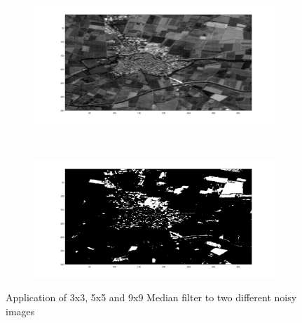\documentclass{article}
\begin{document}
	\begin{figure}[h!]
		\centering
		\begin{subfigure}[t]{0.5\textwidth}
			\centering
			\includegraphics[height=\linewidth, width=\linewidth]{./output_images/village.jpg}
		\end{subfigure}%
		~
		\begin{subfigure}[t]{0.5\textwidth}
			\centering
			\includegraphics[height=\linewidth, width=\linewidth]{./output_images/lab6_step1.jpg}
		\end{subfigure}	
		\caption{Application of 3x3, 5x5 and 9x9 Median filter to two different noisy images}
	\end{figure}
\end{document}
